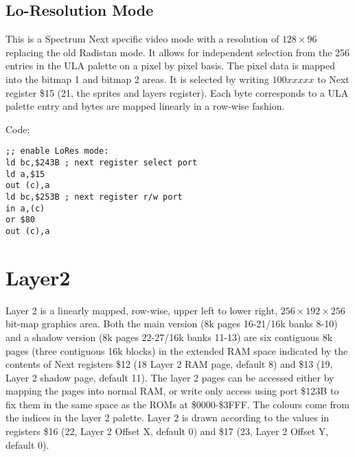 \subsection{Lo-Resolution Mode}

This is a Spectrum Next specific video mode with a resolution of
$128\times96$ replacing the old Radistan mode.  It allows for
independent selection from the 256 entries in the ULA palette on a
pixel by pixel basis. The pixel data is mapped into the bitmap 1 and
bitmap 2 areas.  It is selected by writing $100xxxxx$ to Next register
\$15 (21, the sprites and layers register).  Each byte corresponds to
a ULA palette entry and bytes are mapped linearly in a row-wise
fashion.

Code:
\begin{verbatim}
;; enable LoRes mode:
ld bc,$243B ; next register select port
ld a,$15
out (c),a
ld bc,$253B ; next register r/w port
in a,(c)
or $80
out (c),a
\end{verbatim}



\section{Layer2}
Layer 2 is a linearly mapped, row-wise, upper left to lower right,
$256\times192\times256$ bit-map graphics area.  Both the main version
(8k pages 16-21/16k banks 8-10) and a shadow version (8k pages
22-27/16k banks 11-13) are six contiguous 8k pages (three contiguous
16k blocks) in the extended RAM space indicated by the contents of
Next registers \$12 (18 Layer 2 RAM page, default 8) and \$13 (19,
Layer 2 shadow page, default 11).  The layer 2 pages can be accessed
either by mapping the pages into normal RAM, or write only access
using port \$123B to fix them in the same space as the ROMs at
\$0000-\$3FFF.  The colours come from the indices in the layer 2
palette.  Layer 2 is drawn according to the values in registers \$16
(22, Layer 2 Offset X, default 0) and \$17 (23, Layer 2 Offset Y,
default 0).


